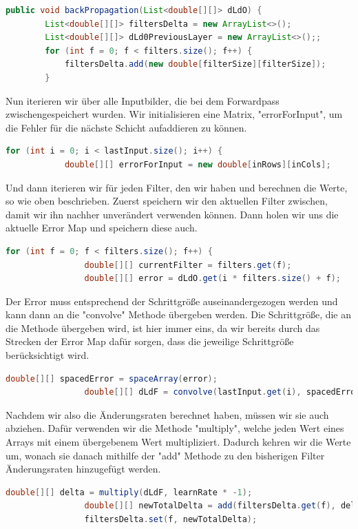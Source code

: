 \documentclass[12pt]{article}
\begin{document}
\begin{lstlisting}[language=Java]
public void backPropagation(List<double[][]> dLdO) {
        List<double[][]> filtersDelta = new ArrayList<>();
        List<double[][]> dLd0PreviousLayer = new ArrayList<>();;
        for (int f = 0; f < filters.size(); f++) {
            filtersDelta.add(new double[filterSize][filterSize]);
        }
\end{lstlisting}
Nun iterieren wir über alle Inputbilder, die bei dem Forwardpass zwischengespeichert wurden. Wir initialisieren eine Matrix, "errorForInput", um die Fehler für die nächste Schicht aufaddieren zu können.
\begin{lstlisting}[language=Java]
        for (int i = 0; i < lastInput.size(); i++) {
            double[][] errorForInput = new double[inRows][inCols];
\end{lstlisting}
Und dann iterieren wir für jeden Filter, den wir haben und berechnen die Werte, so wie oben beschrieben.
Zuerst speichern wir den aktuellen Filter zwischen, damit wir ihn nachher unverändert verwenden können. Dann holen wir uns die aktuelle Error Map und speichern diese auch.
\begin{lstlisting}[language=Java]
            for (int f = 0; f < filters.size(); f++) {
                double[][] currentFilter = filters.get(f);
                double[][] error = dLdO.get(i * filters.size() + f);
\end{lstlisting}
Der Error muss entsprechend der Schrittgröße auseinandergezogen werden und kann dann an die "convolve" Methode übergeben werden. Die Schrittgröße, die an die Methode übergeben wird, ist hier immer eins, da wir bereits durch das Strecken der Error Map dafür sorgen, dass die jeweilige Schrittgröße berücksichtigt wird.
\begin{lstlisting}[language=Java]
                double[][] spacedError = spaceArray(error);
                double[][] dLdF = convolve(lastInput.get(i), spacedError, 1);
\end{lstlisting}
Nachdem wir also die Änderungsraten berechnet haben, müssen wir sie auch abziehen. Dafür verwenden wir die Methode "multiply", welche jeden Wert eines Arrays mit einem übergebenem Wert multipliziert. Dadurch kehren wir die Werte um, wonach sie danach mithilfe der "add" Methode zu den bisherigen Filter Änderungsraten hinzugefügt werden.
\begin{lstlisting}[language=Java]
                double[][] delta = multiply(dLdF, learnRate * -1);
                double[][] newTotalDelta = add(filtersDelta.get(f), delta);
                filtersDelta.set(f, newTotalDelta);
\end{lstlisting}
\end{document}
